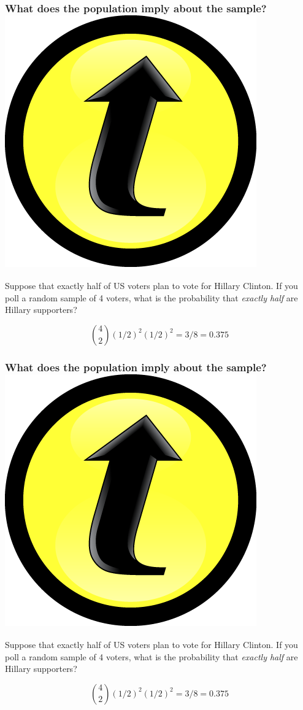 \documentclass[handout]{beamer}
\begin{document}
\begin{frame}
  \frametitle{What does the population imply about the sample? \hfill\includegraphics[scale = 0.05]{./images/clicker}}
Suppose that exactly half of US voters plan to vote for Hillary Clinton. 
If you poll a random sample of 4 voters, what is the probability that \emph{exactly half} are Hillary supporters? 

\pause

$${4 \choose 2} \left( 1/2 \right)^2 \left( 1/2 \right)^2 = 3/8 = 0.375$$
\end{frame}
\begin{frame}
  \frametitle{What does the population imply about the sample? \hfill\includegraphics[scale = 0.05]{./images/clicker}}
Suppose that exactly half of US voters plan to vote for Hillary Clinton. 
If you poll a random sample of 4 voters, what is the probability that \emph{exactly half} are Hillary supporters? 

\pause

$${4 \choose 2} \left( 1/2 \right)^2 \left( 1/2 \right)^2 = 3/8 = 0.375$$
\end{frame}
\end{document}
